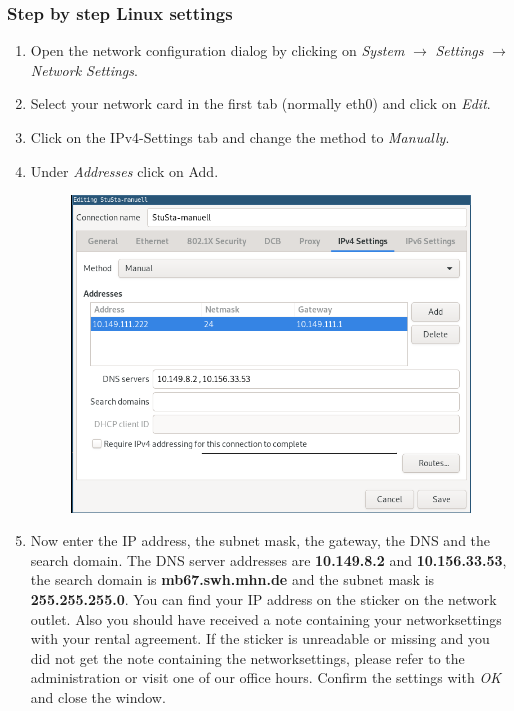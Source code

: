 \documentclass[a4paper,12pt]{scrartcl}
\begin{document}
\subsubsection*{Step by step Linux settings}
\begin{enumerate}
	\item Open the network configuration dialog by clicking on \emph{System} $\rightarrow$ \emph{Settings} $\rightarrow$ \emph{Network Settings}.
	\item Select your network card in the first tab (normally eth0) and click on \emph{Edit}.
	\item Click on the IPv4-Settings tab and change the method to \emph{Manually}.
	\item Under \emph{Addresses} click on Add.
      \begin{figure}[h!]
	\centering
		\begin{minipage}[c]{0.5\linewidth}
			\centering
			\includegraphics[width=0.9\linewidth,keepaspectratio]{Bilder/IP_Linux_mb_neu}
			\vspace{-15pt}
		\end{minipage}
	\end{figure}
  \item Now enter the IP address, the subnet mask, the gateway, the DNS and the search domain. The DNS server addresses are \textbf{10.149.8.2} and \textbf{10.156.33.53}, the search domain is \textbf{mb67.swh.mhn.de} and the subnet mask is \textbf{255.255.255.0}. You can find your IP address on the sticker on the network outlet. Also you should have received a note containing your networksettings with your rental agreement. If the sticker is unreadable or missing and you did not get the note containing the networksettings, please refer to the administration or visit one of our office hours. Confirm the settings with \emph{OK} and close the window.
\end{enumerate}
\end{document}
